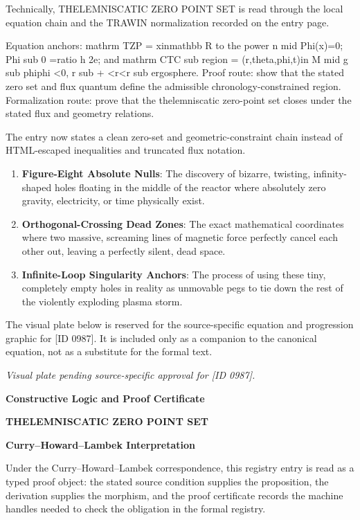 Technically, THELEMNISCATIC ZERO POINT SET is read through the local equation chain and the TRAWIN normalization recorded on the entry page.

Equation anchors: mathrm TZP = xinmathbb R to the power n mid Phi(x)=0; Phi sub 0 =ratio h 2e; and mathrm CTC sub region = (r,theta,phi,t)in M mid g sub phiphi <0, r sub + <r<r sub ergosphere. Proof route: show that the stated zero set and flux quantum define the admissible chronology-constrained region. Formalization route: prove that the thelemniscatic zero-point set closes under the stated flux and geometry relations.

The entry now states a clean zero-set and geometric-constraint chain instead of HTML-escaped inequalities and truncated flux notation.
\endgroup

\begin{enumerate}[leftmargin=1.6em,itemsep=6pt,topsep=4pt]
\item \textbf{Figure-Eight Absolute Nulls}: The discovery of bizarre, twisting, infinity-shaped holes floating in the middle of the reactor where absolutely zero gravity, electricity, or time physically exist.
\item \textbf{Orthogonal-Crossing Dead Zones}: The exact mathematical coordinates where two massive, screaming lines of magnetic force perfectly cancel each other out, leaving a perfectly silent, dead space.
\item \textbf{Infinite-Loop Singularity Anchors}: The process of using these tiny, completely empty holes in reality as unmovable pegs to tie down the rest of the violently exploding plasma storm.
\end{enumerate}

\begingroup\footnotesize\sloppy
The visual plate below is reserved for the source-specific equation and progression graphic for [ID 0987]. It is included only as a companion to the canonical equation, not as a substitute for the formal text.
\par\endgroup
\begingroup\footnotesize\itshape
Visual plate pending source-specific approval for [ID 0987].
\par\endgroup

\clearpage
\begingroup\tzpsupportsetup
\noindent\textbf{\fontsize{10.8pt}{12.8pt}\selectfont [ID 0987] Constructive Logic and Proof Certificate}\par
\noindent\textbf{\fontsize{10pt}{12pt}\selectfont THELEMNISCATIC ZERO POINT SET}\par
\vspace{0.45em}
\begingroup
\footnotesize
\setlength{\parskip}{0.22em}
\setlength{\parindent}{0pt}
\noindent\textbf{Curry--Howard--Lambek Interpretation}\par
Under the Curry--Howard--Lambek correspondence, this registry entry is read as a typed proof
object: the stated source condition supplies the proposition, the derivation supplies the
morphism, and the proof certificate records the machine handles needed to check the obligation
in the formal registry.

